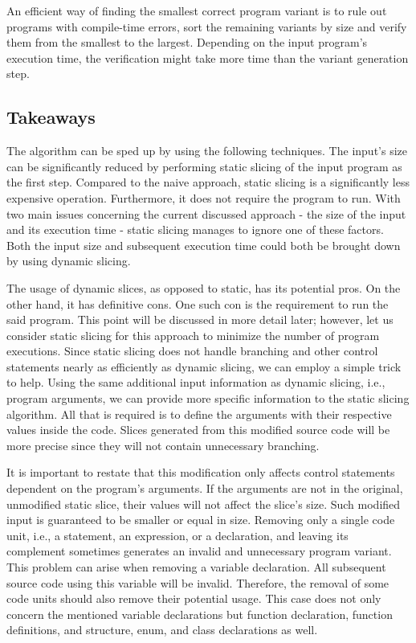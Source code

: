 An efficient way of finding the smallest correct program variant is to rule 
out programs with compile-time errors, sort the remaining variants by size 
and verify them from the smallest to the largest.
Depending on the input program's execution time, the verification might take 
more time than the variant generation step.

\subsection{Takeaways} \label{sec:takeaways}


The algorithm can be sped up by using the following techniques.
The input's size can be significantly reduced by performing static 
slicing of the input program as the first step.
Compared to the naive approach, static slicing is a significantly less 
expensive operation.
Furthermore, it does not require the program to run.
With two main issues concerning the current discussed approach - the size 
of the input and its execution time - static slicing manages to ignore 
one of these factors.
Both the input size and subsequent execution time could both be brought 
down by using dynamic slicing.

The usage of dynamic slices, as opposed to static, has its potential pros.
On the other hand, it has definitive cons.
One such con is the requirement to run the said program.
This point will be discussed in more detail later; however, let us consider 
static slicing for this approach to minimize the number of program executions.
Since static slicing does not handle branching and other control statements 
nearly as efficiently as dynamic slicing, we can employ a simple trick 
to help.
Using the same additional input information as dynamic slicing, i.e., 
program arguments, we can provide more specific information 
to the static slicing algorithm.
All that is required is to define the arguments with their respective 
values inside the code.
Slices generated from this modified source code will be more precise 
since they will not contain unnecessary branching.

It is important to restate that this modification only affects control 
statements dependent on the program's arguments.
If the arguments are not in the original, unmodified static slice, their 
values will not affect the slice's size.
Such modified input is guaranteed to be smaller or equal in size.
Removing only a single code unit, i.e., a statement, an expression, 
or a declaration, and leaving its complement sometimes generates 
an invalid and unnecessary program variant.
This problem can arise when removing a variable declaration.
All subsequent source code using this variable will be invalid.
Therefore, the removal of some code units should also remove their potential 
usage.
This case does not only concern the mentioned variable declarations but 
function declaration, function definitions, and structure, enum, 
and class declarations as well.

